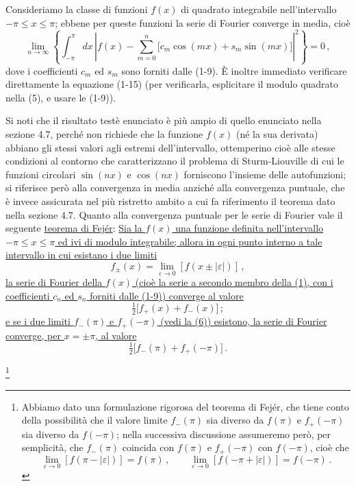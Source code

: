 \documentclass[11pt, a4paper]{book}
\numberwithin{equation}{section}
\begin{document}
Consideriamo la classe di funzioni $f(x)$ di quadrato integrabile nell'intervallo $-\pi \leq x \leq \pi$; ebbene per queste funzioni la serie di Fourier converge in media, cioè
\begin{equation}
  \lim_{n\to\infty}\left\{\int_{-\pi}^{\pi} dx\,\left|f(x)-\sum_{m=0}^{n}\bigl[c_m\cos(mx)+s_m\sin(mx)\bigr]\right|^2\right\} = 0\,, \tag{5}
\end{equation}
dove i coefficienti $c_m$ ed $s_m$ sono forniti dalle (1-9). È inoltre immediato verificare direttamente la equazione (1-15) (per verificarla, esplicitare il modulo quadrato nella (5), e usare le (1-9)).

Si noti che il risultato testè enunciato è più ampio di quello enunciato nella sezione 4.7, perché non richiede che la funzione $f(x)$ (né la sua derivata) abbiano gli stessi valori agli estremi dell'intervallo, ottemperino cioè alle stesse condizioni al contorno che caratterizzano il problema di Sturm-Liouville di cui le funzioni circolari $\sin(nx)$ e $\cos(nx)$ forniscono l'insieme delle autofunzioni; si riferisce però alla convergenza in media anziché alla convergenza puntuale, che è invece assicurata nel più ristretto ambito a cui fa riferimento il teorema dato nella sezione 4.7. Quanto alla convergenza puntuale per le serie di Fourier vale il seguente \uline{teorema di Fejér}: \uline{Sia la $f(x)$ una funzione definita nell'intervallo $-\pi \leq x \leq \pi$ ed ivi di modulo integrabile; allora in ogni punto interno a tale intervallo in cui esistano i due limiti}
\begin{equation}
  f_\pm(x) = \lim_{\varepsilon\to 0}\left[f(x\pm|\varepsilon|)\right]\,, \tag{6}
\end{equation}
\uline{la serie di Fourier della $f(x)$ (cioè la serie a secondo membro della (1), con i coefficienti $c_n$ ed $s_n$ forniti dalle (1-9)) converge al valore}
\[
  \tfrac{1}{2}\bigl[f_+(x)+f_-(x)\bigr]\,;
\]
\uline{e se i due limiti $f_-(\pi)$ e $f_+(-\pi)$ (vedi la (6)) esistono, la serie di Fourier converge, per $x=\pm\pi$, al valore}
\[
  \tfrac{1}{2}\bigl[f_-(\pi)+f_+(-\pi)\bigr]\,.
\]

\footnote{Abbiamo dato una formulazione rigorosa del teorema di Fejér, che tiene conto della possibilità che il valore limite $f_-(\pi)$ sia diverso da $f(\pi)$ e $f_+(-\pi)$ sia diverso da $f(-\pi)$; nella successiva discussione assumeremo però, per semplicità, che $f_-(\pi)$ coincida con $f(\pi)$ e $f_+(-\pi)$ con $f(-\pi)$, cioè che
\[
  \lim_{\varepsilon\to 0}\left[f(\pi-|\varepsilon|)\right] = f(\pi)\,,\qquad
  \lim_{\varepsilon\to 0}\left[f(-\pi+|\varepsilon|)\right] = f(-\pi)\,.
\]}
\end{document}
